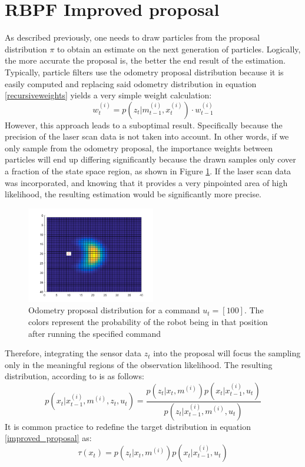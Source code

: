 \documentclass[letterpaper]{article}
\begin{document}
\section{RBPF Improved proposal}
As described previously, one needs to draw particles from the proposal distribution $\pi$ to obtain an estimate on the next generation of particles. Logically, the more accurate the proposal is, the better the end result of the estimation. Typically, particle filters use the odometry proposal distribution because it is easily computed and replacing said odometry distribution in equation \ref{recursiveweights} yields a very simple weight calculation:
\begin{equation}
w_t^{(i)}= p(z_t|m_{t-1}^{(i)}, x_t^{(i)}) \cdot w_{t-1}^{(i)}
\end{equation}
However, this approach leads to a suboptimal result. Specifically because the precision of the laser scan data is not taken into account. In other words, if we only sample from the odometry proposal, the importance weights between particles will end up differing significantly because the drawn samples only cover a fraction of the state space region, as shown in Figure \ref{odometry_motion_model}. If the laser scan data was incorporated, and knowing that it provides a very pinpointed area of high likelihood, the resulting estimation would be significantly more precise.  
\begin{figure}[h]
	\centering
	\includegraphics[width=0.5\textwidth]{figures/motion_model_odometry}
	\caption{Odometry proposal distribution for a command $u_t = [10 0]$. The colors represent the probability of the robot being in that position after running the specified command}
	\label{odometry_motion_model}
\end{figure}
Therefore, integrating the sensor data $z_t$ into the proposal will focus the sampling only in the meaningful regions of the observation likelihood. The resulting distribution, according to \cite{optimal_proposal} is as follows: 
\begin{equation}
	\label{improved_proposal}
	p(x_t|x_{t-1}^{(i)}, m^{(i)}, z_t, u_t)=\frac{p(z_t|x_t, m^{(i)})p(x_t|x_{t-1}^{(i)}, u_t)}{p(z_t|x_{t-1}^{(i)}, m^{(i)}, u_t)}
\end{equation}
It is common practice to redefine the target distribution in equation \ref{improved_proposal} as:
\begin{equation*}
\tau (x_t)= p(z_t|x_t, m^{(i)})p(x_t|x_{t-1}^{(i)}, u_t)
\end{equation*} 
\end{document}
